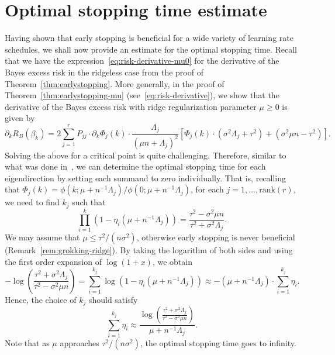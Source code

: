 \documentclass[11pt]{article}
\begin{document}
\section{Optimal stopping time estimate} \label{sec:time-estimate}

Having shown that early stopping is beneficial for a wide variety of learning rate schedules, we shall now provide an estimate for the optimal stopping time.
Recall that we have the expression~\eqref{eq:risk-derivative-mu0} for the derivative of the Bayes excess risk in the ridgeless case from the proof of Theorem~\ref{thm:earlystopping}. More generally, in the proof of Theorem~\ref{thm:earlystopping-mu} (see~\eqref{eq:risk-derivative}), we show that the derivative of the Bayes excess risk with ridge regularization parameter $\mu \geq 0$ is given by
\[
    \partial_k R_B(\beta_k) = 2 \sum_{j=1}^{r} P_{jj} \cdot \partial_k \Phi_j(k) \cdot \frac{\Lambda_j}{(\mu n + \Lambda_j)^2} \left[\Phi_j(k) \cdot (\sigma^2 \Lambda_j + \tau^2) + (\sigma^2 \mu n - \tau^2) \right].
\]
Solving the above for a critical point is quite challenging. Therefore, similar to what was done in~\cite{AdSaSo2020}, we can determine the optimal stopping time for each eigendirection by setting each summand to zero individually.
That is, recalling that $\Phi_j(k) = \phi(k; \mu + n^{-1} \Lambda_j) / \phi(0; \mu + n^{-1} \Lambda_j)$, for each $j = 1, \ldots, \mathrm{rank}(r)$, we need to find $k_j$ such that
\begin{equation}
    \prod_{i=1}^k (1 - \eta_i (\mu + n^{-1} \Lambda_j))
    = \frac{\tau^2 - \sigma^2 \mu n}{\tau^2 + \sigma^2 \Lambda_j}.
\end{equation}
We may assume that $\mu \le \tau^2 / (n \sigma^2)$, otherwise early stopping is never beneficial (Remark~\ref{rem:grokking-ridge}). By taking the logarithm of both sides and using the first order expansion of $\log(1+x)$, we obtain
\[
    -\log\left(\frac{\tau^2 + \sigma^2 \Lambda_j}{\tau^2 - \sigma^2 \mu n}\right) = \sum_{i=1}^{k_j}\log(1 - \eta_i (\mu + n^{-1} \Lambda_{j})) \approx -(\mu + n^{-1} \Lambda_{j}) \cdot \sum_{i=1}^{k_j} \eta_i.
\]
Hence, the choice of $k_j$ should satisfy
\begin{equation} \label{eq:when-to-stop}
    \sum_{i=1}^{k_j} \eta_i \approx \frac{\log\left(\frac{\tau^2 + \sigma^2 \Lambda_j}{\tau^2 - \sigma^2 \mu n}\right)}{\mu + n^{-1} \Lambda_{j}}.
\end{equation}
Note that as $\mu$ approaches $\tau^2 / (n \sigma^2)$, the optimal stopping time goes to infinity. 
\end{document}
